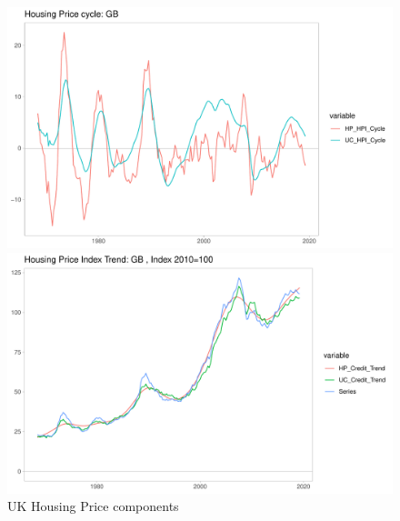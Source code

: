 \documentclass[fleqn]{article}
\begin{document}
\begin{outline}[enumerate]
\begin{figure}[h!]
	\caption{UK Housing Price components}	
	\centerline{\includegraphics[scale=0.7]{../../VAR_2_notempcovar/Output/Graphs/HP_cycle_GB.pdf}}
	\centerline{\includegraphics[scale=0.7]{../../VAR_2_notempcovar/Output/Graphs/HP_trend_GB.pdf}}
\end{figure}






\end{outline}
\end{document}
